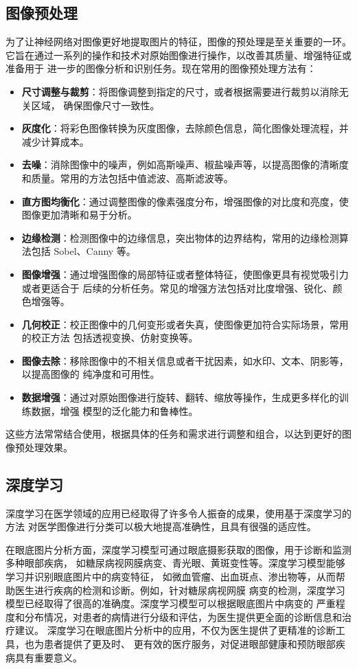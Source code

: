 \documentclass[UTF8,12pt,a4paper]{ctexart}
\begin{document}
\subsection{图像预处理}
为了让神经网络对图像更好地提取图片的特征，图像的预处理是至关重要的一环。
它旨在通过一系列的操作和技术对原始图像进行操作，以改善其质量、增强特征或准备用于
进一步的图像分析和识别任务。现在常用的图像预处理方法有：
\begin{itemize}
	\item \textbf{尺寸调整与裁剪}：将图像调整到指定的尺寸，或者根据需要进行裁剪以消除无关区域，
确保图像尺寸一致性。
	\item \textbf{灰度化}：将彩色图像转换为灰度图像，去除颜色信息，简化图像处理流程，并减少计算成本。
	\item \textbf{去噪}：消除图像中的噪声，例如高斯噪声、椒盐噪声等，以提高图像的清晰度和质量。常用的方法包括中值滤波、高斯滤波等。
	\item \textbf{直方图均衡化}：通过调整图像的像素强度分布，增强图像的对比度和亮度，使图像更加清晰和易于分析。
	\item \textbf{边缘检测}：检测图像中的边缘信息，突出物体的边界结构，常用的边缘检测算法包括 Sobel、Canny 等。
	\item \textbf{图像增强}：通过增强图像的局部特征或者整体特征，使图像更具有视觉吸引力或者更适合于
后续的分析任务。常见的增强方法包括对比度增强、锐化、颜色增强等。
	\item \textbf{几何校正}：校正图像中的几何变形或者失真，使图像更加符合实际场景，常用的校正方法
包括透视变换、仿射变换等。
	\item \textbf{图像去除}：移除图像中的不相关信息或者干扰因素，如水印、文本、阴影等，以提高图像的
纯净度和可用性。
	\item \textbf{数据增强}：通过对原始图像进行旋转、翻转、缩放等操作，生成更多样化的训练数据，增强
模型的泛化能力和鲁棒性。
\end{itemize}

这些方法常常结合使用，根据具体的任务和需求进行调整和组合，以达到更好的图像预处理效果。

\subsection{深度学习}
深度学习在医学领域的应用已经取得了许多令人振奋的成果，使用基于深度学习的方法
对医学图像进行分类可以极大地提高准确性，且具有很强的适应性。

在眼底图片分析方面，深度学习模型可通过眼底摄影获取的图像，用于诊断和监测多种眼部疾病，
如糖尿病视网膜病变、青光眼、黄斑变性等。深度学习模型能够学习并识别眼底图片中的病变特征，
如微血管瘤、出血斑点、渗出物等，从而帮助医生进行疾病的检测和诊断。例如，针对糖尿病视网膜
病变的检测，深度学习模型已经取得了很高的准确度。深度学习模型可以根据眼底图片中病变的
严重程度和分布情况，对患者的病情进行分级和评估，为医生提供更全面的诊断信息和治疗建议。
深度学习在眼底图片分析中的应用，不仅为医生提供了更精准的诊断工具，也为患者提供了更及时、
更有效的医疗服务，对促进眼部健康和预防眼部疾病具有重要意义。
\end{document}

